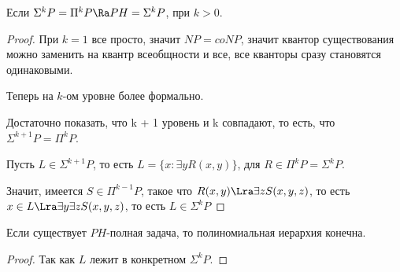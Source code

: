 \begin{theorem}
	Если $\Sigma^k P = \Pi^k P \Ra PH = \Sigma^kP$, при $k > 0$. 
\end{theorem}
\begin{proof}
	При $k = 1$ все просто, значит $NP = coNP$, значит квантор существования можно заменить на квантр всеобщности и все,
	все кванторы сразу становятся одинаковыми.

	Теперь на $k$-ом уровне более формально.
	
	Достаточно показать, что k + 1 уровень и k совпадают, то есть, что $\Sigma^{k + 1}P = \Pi^kP$.

	Пусть $L \in \Sigma^{k + 1}P$, то есть $L = \{x \colon \exists y R(x, y)\}$, для $R \in \Pi^k P = \Sigma^k P$.

	Значит, имеется $S \in \Pi^{k - 1}P$, такое что $R(x, y) \Lra \exists z S(x, y, z)$, то есть
	$x \in L \Lra \exists y \exists z S(x,y, z)$, то есть $L \in \Sigma^{k}P$ 
\end{proof}

\begin{conseq}
	Если существует $PH$-полная задача, то полиномиальная иерархия конечна. 
\end{conseq}

\begin{proof}
	Так как $L$ лежит в конкретном $\Sigma^k P$.
\end{proof}




